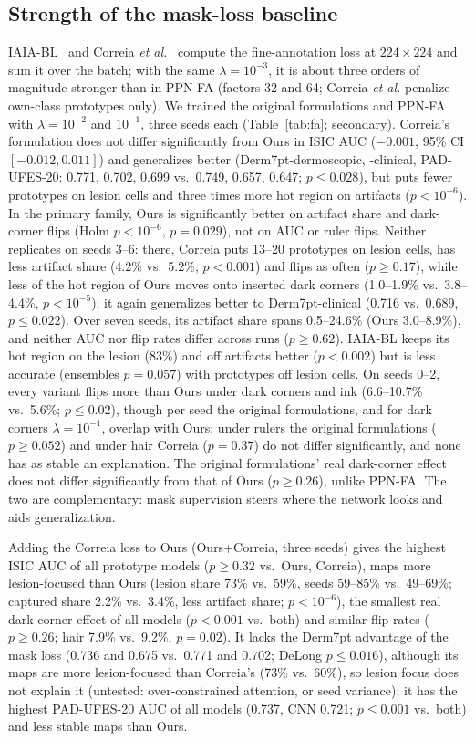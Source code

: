 \documentclass[conference]{IEEEtran}
\begin{document}
\subsection{Strength of the mask-loss baseline}
\label{sec:fa}
IAIA-BL~\cite{barnett2021} and Correia \emph{et al.}~\cite{correia2023} compute the fine-annotation loss at $224\times224$ and sum it over the batch; with the same $\lambda=10^{-3}$, it is about three orders of magnitude stronger than in PPN-FA (factors 32 and 64; Correia \emph{et al.} penalize own-class prototypes only). We trained the original formulations and PPN-FA with $\lambda=10^{-2}$ and $10^{-1}$, three seeds each (Table~\ref{tab:fa}; secondary). Correia's formulation does not differ significantly from Ours in ISIC AUC ($-0.001$, 95\% CI $[-0.012,0.011]$) and generalizes better (Derm7pt-dermoscopic, -clinical, PAD-UFES-20: 0.771, 0.702, 0.699 vs.\ 0.749, 0.657, 0.647; $p\leq0.028$), but puts fewer prototypes on lesion cells and three times more hot region on artifacts ($p<10^{-6}$). In the primary family, Ours is significantly better on artifact share and dark-corner flips (Holm $p<10^{-6}$, $p=0.029$), not on AUC or ruler flips. Neither replicates on seeds 3--6: there, Correia puts 13--20 prototypes on lesion cells, has less artifact share (4.2\% vs.\ 5.2\%, $p<0.001$) and flips as often ($p\geq0.17$), while less of the hot region of Ours moves onto inserted dark corners (1.0--1.9\% vs.\ 3.8--4.4\%, $p<10^{-5}$); it again generalizes better to Derm7pt-clinical (0.716 vs.\ 0.689, $p\leq0.022$). Over seven seeds, its artifact share spans 0.5--24.6\% (Ours 3.0--8.9\%), and neither AUC nor flip rates differ across runs ($p\geq0.62$). IAIA-BL keeps its hot region on the lesion (83\%) and off artifacts better ($p<0.002$) but is less accurate (ensembles $p=0.057$) with prototypes off lesion cells. On seeds 0--2, every variant flips more than Ours under dark corners and ink (6.6--10.7\% vs.\ 5.6\%; $p\leq0.02$), though per seed the original formulations, and for dark corners $\lambda=10^{-1}$, overlap with Ours; under rulers the original formulations ($p\geq0.052$) and under hair Correia ($p=0.37$) do not differ significantly, and none has as stable an explanation. The original formulations' real dark-corner effect does not differ significantly from that of Ours ($p\geq0.26$), unlike PPN-FA. The two are complementary: mask supervision steers where the network looks and aids generalization.

Adding the Correia loss to Ours (Ours+Correia, three seeds) gives the highest ISIC AUC of all prototype models ($p\geq0.32$ vs.\ Ours, Correia), maps more lesion-focused than Ours (lesion share 73\% vs.\ 59\%, seeds 59--85\% vs.\ 49--69\%; captured share 2.2\% vs.\ 3.4\%, less artifact share; $p<10^{-6}$), the smallest real dark-corner effect of all models ($p<0.001$ vs.\ both) and similar flip rates ($p\geq0.26$; hair 7.9\% vs.\ 9.2\%, $p=0.02$). It lacks the Derm7pt advantage of the mask loss (0.736 and 0.675 vs.\ 0.771 and 0.702; DeLong $p\leq0.016$), although its maps are more lesion-focused than Correia's (73\% vs.\ 60\%), so lesion focus does not explain it (untested: over-constrained attention, or seed variance); it has the highest PAD-UFES-20 AUC of all models (0.737, CNN 0.721; $p\leq0.001$ vs.\ both) and less stable maps than Ours.
\end{document}
